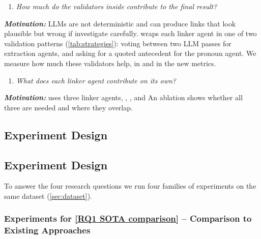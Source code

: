 \begin{enumerate}[leftmargin=*, labelindent=0em, label=\textbf{RQ\arabic*}:, ref=RQ\arabic*, series=researchQuestions, resume]
    \item \label{RQ3 validators} \emph{How much do the validators inside \approach contribute to the final result?}
\end{enumerate}
\emph{\textbf{Motivation:}}
\acp{LLM} are not deterministic and can produce links that look plausible but wrong if investigate carefully. %
\approach wraps each linker agent in one of two validation patterns (\autoref{tab:strategies}): voting between two \ac{LLM} passes for extraction agents, and asking for a quoted antecedent for the pronoun agent.
We measure how much these validators help, in \fone and in the new metrics.


\begin{enumerate}[leftmargin=*, labelindent=0em, label=\textbf{RQ\arabic*}:, ref=RQ\arabic*, series=researchQuestions, resume]
    \item \label{RQ4 ablation} \emph{What does each linker agent contribute on its own?}
\end{enumerate}
\emph{\textbf{Motivation:}}
\approach uses three linker agents, \linkerA, \linkerB, and \linkerC
An ablation shows whether all three are needed and where they overlap.


\subsection{Experiment Design}



\subsection{Experiment Design}
\label{sec:exp-design}

To answer the four research questions we run four families of experiments on the same dataset (\autoref{sec:dataset}).

\subsubsection{Experiments for \ref{RQ1 SOTA comparison} -- Comparison to Existing Approaches}
\label{sec:exp:rq1}

